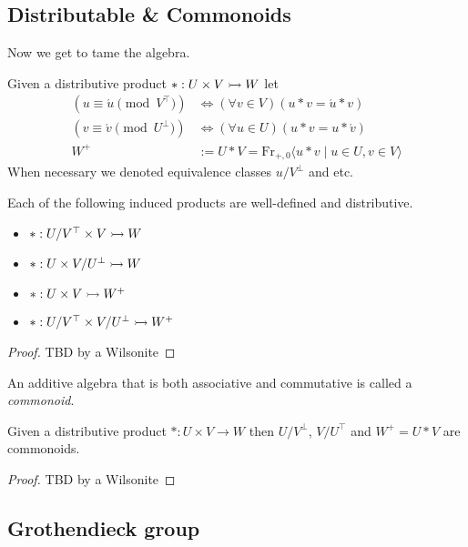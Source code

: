 \subsection{Distributable \& Commonoids}

Now we get to tame the algebra.  
\begin{definition}
    Given a distributive product $*:U\times V\rightarrowtail W$
    let 
    \begin{align*}
        (u\equiv \acute{u} \pmod{V^{\top}}) & \Leftrightarrow (\forall v\in V)(u*v=\acute{u}*v)\\
        (v\equiv \acute{v} \pmod{U^{\bot}}) & \Leftrightarrow (\forall u\in U)(u*v=u*\acute{v})\\
        W^+ & := U*V=\text{Fr}_{+,0}\langle u*v \mid u\in U, v\in V\rangle
    \end{align*}
    When necessary we denoted equivalence classes $u/{V^{\bot}}$ and etc.
\end{definition}

\begin{proposition}
    Each of the following induced products are well-defined and distributive.
    \begin{itemize}
        \item $*:U/V^{\top} \times V\rightarrowtail W$
        \item $*:U \times V/U^{\bot}\rightarrowtail W$
        \item $*:U \times V\rightarrowtail W^+$
        \item $*:U/V^{\top} \times V/U^{\bot}\rightarrowtail W^+$
    \end{itemize}
\end{proposition}
\begin{proof}
    TBD by a Wilsonite
\end{proof}

\begin{definition}
    An additive algebra that is both associative and commutative is called a \emph{commonoid}.
\end{definition}

\begin{proposition}
    Given a distributive product $*:U\times V\to W$ then 
    $U/V^{\bot}$, $V/U^{\top}$ and $W^+=U*V$ are commonoids.
\end{proposition}
\begin{proof}
    TBD by a Wilsonite
\end{proof}

\subsection{Grothendieck group}

